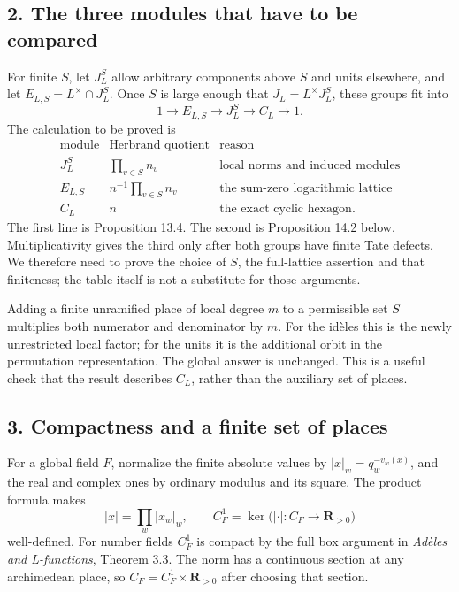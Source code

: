 \documentclass[11pt,a4paper]{article}
\begin{document}
\subsection{2. The three modules that have to be
compared}\label{the-three-modules-that-have-to-be-compared}

For finite \(S\), let \(J_L^S\) allow arbitrary components above \(S\)
and units elsewhere, and let \(E_{L,S}=L^\times\cap J_L^S\). Once \(S\)
is large enough that \(J_L=L^\times J_L^S\), these groups fit into \[
1\longrightarrow E_{L,S}\longrightarrow J_L^S\longrightarrow C_L\longrightarrow1.
\] The calculation to be proved is \[
\begin{array}{c|c|c}
\text{module}&\text{Herbrand quotient}&\text{reason}\\\hline
J_L^S&\prod_{v\in S}n_v&\text{local norms and induced modules}\\
E_{L,S}&n^{-1}\prod_{v\in S}n_v&\text{the sum-zero logarithmic lattice}\\
C_L&n&\text{the exact cyclic hexagon}.
\end{array}
\] The first line is Proposition 13.4. The second is Proposition 14.2
below. Multiplicativity gives the third only after both groups have
finite Tate defects. We therefore need to prove the choice of \(S\), the
full-lattice assertion and that finiteness; the table itself is not a
substitute for those arguments.

Adding a finite unramified place of local degree \(m\) to a permissible
set \(S\) multiplies both numerator and denominator by \(m\). For the
idèles this is the newly unrestricted local factor; for the units it is
the additional orbit in the permutation representation. The global
answer is unchanged. This is a useful check that the result describes
\(C_L\), rather than the auxiliary set of places.

\subsection{3. Compactness and a finite set of
places}\label{compactness-and-a-finite-set-of-places}

For a global field \(F\), normalize the finite absolute values by
\(|x|_w=q_w^{-v_w(x)}\), and the real and complex ones by ordinary
modulus and its square. The product formula makes \[
|x|=\prod_w|x_w|_w,\qquad
C_F^1=\ker\bigl(|\cdot|:C_F\to\mathbf R_{>0}\bigr)
\tag{1}
\] well-defined. For number fields \(C_F^1\) is compact by the full box
argument in \emph{Adèles and L-functions}, Theorem 3.3. The norm has a
continuous section at any archimedean place, so
\(C_F=C_F^1\times\mathbf R_{>0}\) after choosing that section.
\end{document}
